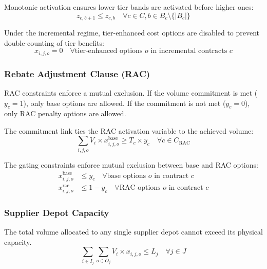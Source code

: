 \begin{itemize}
    Monotonic activation ensures lower tier bands are activated before higher ones:
    \begin{equation}
    z_{c,b+1} \le z_{c,b} \quad \forall c \in C, b \in B_c \setminus \{|B_c|\} \label{eq:monotonic-activation}
    \end{equation}
    
    Under the incremental regime, tier-enhanced cost options are disabled to prevent double-counting of tier benefits:
    \begin{equation}
    x_{i,j,o} = 0 \quad \forall \text{tier-enhanced options } o \text{ in incremental contracts } c \label{eq:disable-tier-enhanced}
    \end{equation}
\end{itemize}

\subsubsection{Rebate Adjustment Clause (RAC)}
RAC constraints enforce a mutual exclusion. If the volume commitment is met ($y_c=1$), only base options are allowed. If the commitment is not met ($y_c=0$), only RAC penalty options are allowed.

The commitment link ties the RAC activation variable to the achieved volume:
\begin{equation}
\sum_{i,j,o} V_i \times x_{i,j,o}^{\text{base}} \ge T_c \times y_c \quad \forall c \in C_{\text{RAC}} \label{eq:rac-commitment}
\end{equation}

The gating constraints enforce mutual exclusion between base and RAC options:
\begin{align}
    x_{i,j,o}^{\text{base}} &\le y_c \quad \forall \text{base options } o \text{ in contract } c \label{eq:rac-base-gate} \\
    x_{i,j,o}^{\text{rac}} &\le 1 - y_c \quad \forall \text{RAC options } o \text{ in contract } c \label{eq:rac-penalty-gate}
\end{align}

\subsubsection{Supplier Depot Capacity}
The total volume allocated to any single supplier depot cannot exceed its physical capacity.
\begin{equation}
\sum_{i\in I_j} \sum_{o\in O_j} V_i \times x_{i,j,o} \le L_j \quad \forall j \in J
\end{equation}

